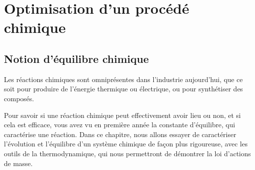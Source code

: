 \documentclass[11pt,fleqn]{book} %
\begin{document}










\setcounter{chapter}{5}

\chapter{Optimisation d'un procédé chimique}

\section{Notion d'équilibre chimique}

Les réactions chimiques sont omniprésentes dans l'industrie aujourd'hui, que ce soit pour produire de l'énergie thermique ou électrique, ou pour synthétiser des composés.

Pour savoir si une réaction chimique peut effectivement avoir lieu ou non, et si cela est efficace, vous avez vu en première année la constante d'équilibre, qui caractérise une réaction. Dans ce chapitre, nous allons essayer de caractériser l'évolution et l'équilibre d'un système chimique de façon plus rigoureuse, avec les outils de la thermodynamique, qui nous permettront de démontrer la loi d'actions de masse.
\end{document}
